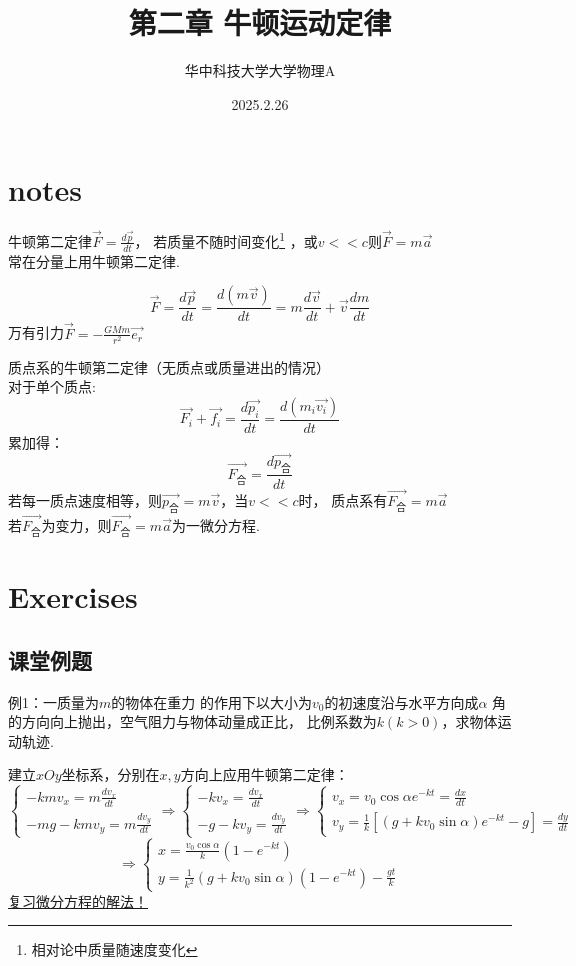 \documentclass[10pt,a4paper]{article}
\title{第二章 牛顿运动定律}
\author{华中科技大学大学物理A}
\date{2025.2.26}
\begin{document}
\maketitle
\section{notes}
牛顿第二定律$\vec{F}=\frac{d\vec{p}}{dt}$，
若质量不随时间变化\footnote{相对论中质量随速度变化}
，或$v<<c$则$\vec{F}=m\vec{a}$\\
常在分量上用牛顿第二定律.

\[\vec{F}=\frac{d\vec{p}}{dt}=\frac{d(m\vec{v})}{dt}
=m\frac{d\vec{v}}{dt}+\vec{v}\frac{dm}{dt}\]
万有引力$\vec{F}=-\frac{GMm}{r^{2}}\vec{e_r}$

质点系的牛顿第二定律（无质点或质量进出的情况）\\
对于单个质点:
\[\vec{F_i}+\vec{f_i}=\frac{d\vec{p_i}}{dt}=\frac{d(m_i\vec{v_i})}{dt}\]
累加得：
\[\vec{F_\text{合}}=\frac{d\vec{p_\text{合}}}{dt}\]
若每一质点速度相等，则$\vec{p_\text{合}}=m\vec{v}$，当$v<<c$时，
质点系有$\vec{F_\text{合}}=m\vec{a}$\\
若$\vec{F_\text{合}}$为变力，则$\vec{F_\text{合}}=m\vec{a}$为一微分方程.

\section{Exercises}
\subsection{课堂例题}
例1：一质量为$m$的物体在重力 的作用下以大小为$v_0$的初速度沿与水平方向成$\alpha$
角的方向向上抛出，空气阻力与物体动量成正比，
比例系数为$k(k>0)$，求物体运动轨迹.

建立$xOy$坐标系，分别在$x,y$方向上应用牛顿第二定律：
\[
\begin{cases}
-kmv_x=m\frac{dv_x}{dt}\\
-mg-kmv_y=m\frac{dv_y}{dt}
\end{cases}\Rightarrow
\begin{cases}
-kv_x=\frac{dv_x}{dt}\\
-g-kv_y=\frac{dv_y}{dt}
\end{cases}\Rightarrow
\begin{cases}
v_x=v_0\cos\alpha e^{-kt}=\frac{dx}{dt}\\
v_y=\frac{1}{k}[(g+kv_0\sin\alpha)e^{-kt}-g]=\frac{dy}{dt}
\end{cases}\]
\[
\Rightarrow
\begin{cases}
x=\frac{v_0\cos\alpha}{k}(1-e^{-kt})\\
y=\frac{1}{k^2}(g+kv_0\sin\alpha)(1-e^{-kt})-\frac{gt}{k}
\end{cases}
\]\underline{复习微分方程的解法！}
\end{document}
